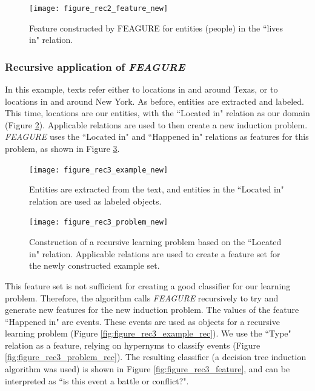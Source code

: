 \documentclass[twoside,11pt]{article}
\theoremstyle{definition}
\begin{document}
\begin{figure}[h!]
	\centering
	\texttt{[image: figure\_rec2\_feature\_new]}
	\caption{Feature constructed by FEAGURE for entities (people) in the ``lives in" relation.}
	\label{fig:figure_rec2_feature}
\end{figure}

\subsubsection{Recursive application of \emph{FEAGURE}}

In this example, texts refer either to locations in and around Texas, or to locations in and around New York. As before, entities are extracted and labeled. This time, locations are our entities, with the ``Located in" relation as our domain (Figure \ref{fig:figure_rec3_example}). Applicable relations are used to then create a new induction problem. \emph{FEAGURE} uses the ``Located in" and ``Happened in" relations as features for this problem, as shown in Figure \ref{fig:figure_rec3_problem}. 

\begin{figure}[!h]
	\centering
	\texttt{[image: figure\_rec3\_example\_new]}
	\caption{Entities are extracted from the text, and entities in the ``Located in" relation are used as labeled objects.}
	\label{fig:figure_rec3_example}
\end{figure}

\begin{figure}[!h]
	\centering
	\texttt{[image: figure\_rec3\_problem\_new]}
	\caption{Construction of a recursive learning problem based on the ``Located in" relation. Applicable relations are used to create a feature set for the newly constructed example set.}
	\label{fig:figure_rec3_problem}
\end{figure}

This feature set is not sufficient for creating a good classifier for our learning problem. Therefore, the algorithm calls \emph{FEAGURE} recursively to try and generate new features for the new induction problem.
The values of the feature ``Happened in" are events. These events are used as objects for a recursive learning problem (Figure \ref{fig:figure_rec3_example_rec}).
We use the ``Type" relation as a feature, relying on hypernyms to classify events (Figure \ref{fig:figure_rec3_problem_rec}).
The resulting classifier (a decision tree induction algorithm was used) is shown in Figure \ref{fig:figure_rec3_feature}, and can be interpreted as ``is this event a battle or conflict?".
\end{document}
